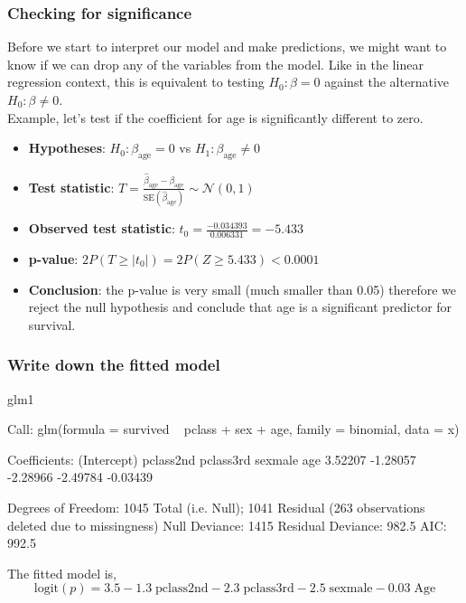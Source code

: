 \documentclass[a4paper]{article}
\begin{document}
\subsubsection{Checking for significance}
Before we start to interpret our model and make predictions, we might want to know if we can drop any of the variables from the model. Like in the linear regression context, this is equivalent to testing \( H_0: \beta = 0 \) against the alternative \( H_0: \beta \neq 0 \).\\
Example, let's test if the coefficient for age is significantly different to zero.
\begin{itemize}
	\item \textbf{Hypotheses}: \( H_0: \beta_{\text{age}} = 0 \) vs \( H_1: \beta_{\text{age}} \neq 0 \)
	\item \textbf{Test statistic}: \( T = \frac{\hat{\beta}_\text{age} - \beta_\text{age}}{\text{SE}(\hat{\beta}_\text{age})} \sim \mathcal{N}(0,1) \)
	\item \textbf{Observed test statistic}: \( t_0 = \frac{-0.034393}{0.006331} = -5.433 \) 
	\item \textbf{p-value}: \( 2P(T \geq \lvert t_0 \rvert) = 2P(Z \geq 5.433) <0.0001 \)
	\item \textbf{Conclusion}: the p-value is very small (much smaller than 0.05) therefore we reject the null hypothesis and conclude that age is a significant predictor for survival.
\end{itemize}
\subsubsection{Write down the fitted model}
\begin{Schunk}
\begin{Sinput}
glm1
\end{Sinput}
\begin{Soutput}

Call:  glm(formula = survived ~ pclass + sex + age, family = binomial, 
    data = x)

Coefficients:
(Intercept)    pclass2nd    pclass3rd      sexmale          age  
    3.52207     -1.28057     -2.28966     -2.49784     -0.03439  

Degrees of Freedom: 1045 Total (i.e. Null);  1041 Residual
  (263 observations deleted due to missingness)
Null Deviance:	    1415 
Residual Deviance: 982.5 	AIC: 992.5
\end{Soutput}
\end{Schunk}
The fitted model is,
\[
	\text{logit}(p) = 3.5 - 1.3\;\text{pclass2nd} - 2.3\;\text{pclass3rd} - 2.5\;\text{sexmale} - 0.03\;\text{Age}
\]
\end{document}

